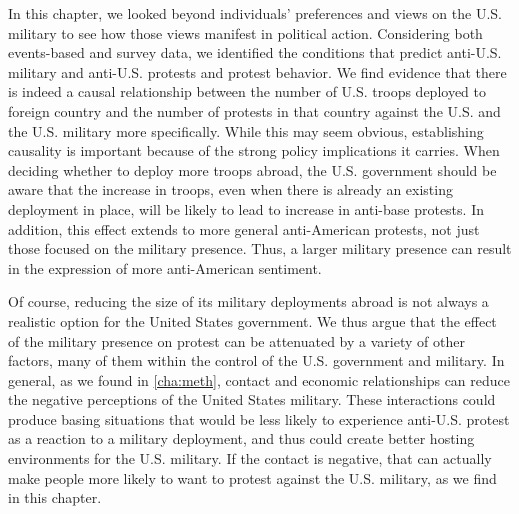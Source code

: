 



In this chapter, we looked beyond individuals' preferences and views on the U.S. military to see how those views manifest in political action. Considering both events-based and survey data, we identified the conditions that predict anti-U.S. military and anti-U.S. protests and protest behavior. We find evidence that there is indeed a causal relationship between the number of U.S. troops deployed to foreign country and the number of protests in that country against the U.S. and the U.S. military more specifically. While this may seem obvious, establishing causality is important because of the strong policy implications it carries. When deciding whether to deploy more troops abroad, the U.S. government should be aware that the increase in troops, even when there is already an existing deployment in place, will be likely to lead to increase in anti-base protests. In addition, this effect extends to more general anti-American protests, not just those focused on the military presence. Thus, a larger military presence can result in the expression of more anti-American sentiment.

Of course, reducing the size of its military deployments abroad is not always a realistic option for the United States government. We thus argue that the effect of the military presence on protest can be attenuated by a variety of other factors, many of them within the control of the U.S. government and military. In general, as we found in \ref{cha:meth}, contact and economic relationships can reduce the negative perceptions of the United States military. These interactions could produce basing situations that would be less likely to experience anti-U.S. protest as a reaction to a military deployment, and thus could create better hosting environments for the U.S. military. If the contact is negative, that can actually make people more likely to want to protest against the U.S. military, as we find in this chapter. 

